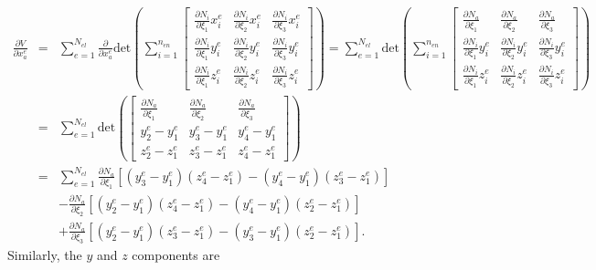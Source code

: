 \documentclass[12pt,aps,pre]{revtex4}
\begin{document}
\begin{eqnarray}
\frac{\partial V}{\partial x_a^e} &=& \sum_{e=1}^{N_{el}} \frac{\partial}{\partial x_a^e}\text{det}\left(\sum_{i=1}^{n_{en}}
\begin{bmatrix}
\frac{\partial N_i}{\partial \xi_1} x_i^e & \frac{\partial N_i}{\partial \xi_2} x_i^e & \frac{\partial N_i}{\partial \xi_3} x_i^e \\
%
\frac{\partial N_i}{\partial \xi_1}y_i^e & \frac{\partial N_i}{\partial \xi_2}y_i^e & \frac{\partial N_i}{\partial \xi_3}y_i^e \\
%
\frac{\partial N_i}{\partial \xi_1}z_i^e & \frac{\partial N_i}{\partial \xi_2}z_i^e & \frac{\partial N_i}{\partial \xi_3}z_i^e 
\end{bmatrix}\right) = \sum_{e=1}^{N_{el}} \text{det}\left(\sum_{i=1}^{n_{en}}
%
\begin{bmatrix}
\frac{\partial N_a}{\partial \xi_1}  & \frac{\partial N_a}{\partial \xi_2} & \frac{\partial N_a}{\partial \xi_3} \\
%
\frac{\partial N_i}{\partial \xi_1}y_i^e  & \frac{\partial N_i}{\partial \xi_2}y_i^e & \frac{\partial N_i}{\partial \xi_3}y_i^e \\
%
\frac{\partial N_i}{\partial \xi_1}z_i^e  & \frac{\partial N_i}{\partial \xi_2}z_i^e & \frac{\partial N_i}{\partial \xi_3}z_i^e 
\end{bmatrix}\right) \nonumber\\
&=& \sum_{e=1}^{N_{el}} \text{det}\left(
%
\begin{bmatrix}
\frac{\partial N_a}{\partial \xi_1}  & \frac{\partial N_a}{\partial \xi_2} & \frac{\partial N_a}{\partial \xi_3} \\
%
y_2^e - y_1^e & y_3^e - y_1^e & y_4^e - y_1^e \\
%
z_2^e - z_1^e & z_3^e - z_1^e & z_4^e - z_1^e 
\end{bmatrix}\right)\nonumber\\
&=& \sum_{e=1}^{N_{el}}\frac{\partial N_a}{\partial \xi_1}[(y_3^e - y_1^e)(z_4^e - z_1^e)-(y_4^e - y_1^e)(z_3^e - z_1^e)] \nonumber\\
%
&&-\frac{\partial N_a}{\partial \xi_2}\left[(y_2^e - y_1^e)(z_4^e - z_1^e)-(y_4^e - y_1^e)(z_2^e - z_1^e)\right] \nonumber\\
%
&&+\frac{\partial N_a}{\partial \xi_3}\left[(y_2^e - y_1^e)(z_3^e - z_1^e)-(y_3^e - y_1^e)(z_2^e - z_1^e)\right].
\label{eq:dVdx}
\end{eqnarray}
%
Similarly, the $y$ and $z$ components are
%
\end{document}
